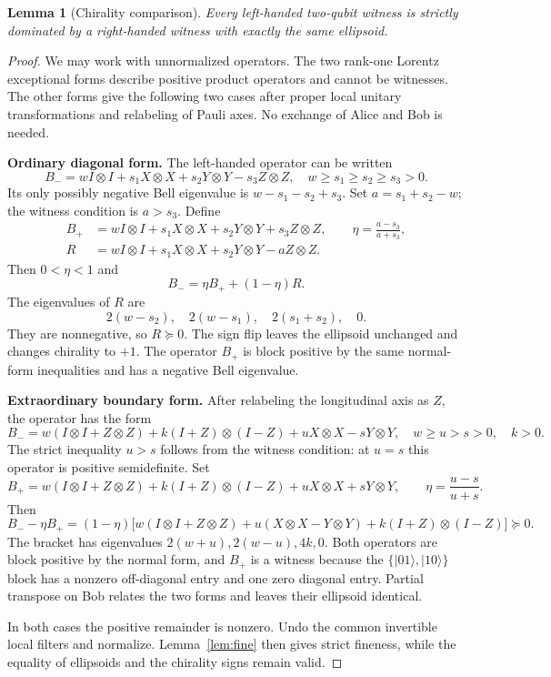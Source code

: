 \documentclass[11pt,a4paper]{article}
\newtheorem{lemma}[theorem]{Lemma}
\theoremstyle{definition}\newtheorem{definition}[theorem]{Definition}
\newcommand{\ket}[1]{\lvert #1\rangle}
\newcommand{\XX}{X\otimes X}
\newcommand{\YY}{Y\otimes Y}
\newcommand{\ZZ}{Z\otimes Z}
\newcommand{\II}{I\otimes I}
\theoremstyle{plain}\newtheorem*{theorem*}{Theorem}
\begin{document}
\begin{lemma}[Chirality comparison]\label{lem:mirror}
Every left-handed two-qubit witness is strictly dominated by a right-handed witness with exactly the same ellipsoid.
\end{lemma}
\begin{proof}
We may work with unnormalized operators. The two rank-one Lorentz exceptional forms describe positive product operators and cannot be witnesses. The other forms give the following two cases after proper local unitary transformations and relabeling of Pauli axes. No exchange of Alice and Bob is needed.

\textbf{Ordinary diagonal form.} The left-handed operator can be written
\[
 B_-=w\II+s_1\XX+s_2\YY-s_3\ZZ,
 \quad w\geq s_1\geq s_2\geq s_3>0.
\]
Its only possibly negative Bell eigenvalue is $w-s_1-s_2+s_3$. Set $a=s_1+s_2-w$; the witness condition is $a>s_3$. Define
\begin{align*}
 B_+&=w\II+s_1\XX+s_2\YY+s_3\ZZ,\qquad \eta=\frac{a-s_3}{a+s_3},\\
 R&=w\II+s_1\XX+s_2\YY-a\ZZ.
\end{align*}
Then $0<\eta<1$ and
\begin{equation}\label{eq:ordinary}
 B_-=\eta B_+ +(1-\eta)R.
\end{equation}
The eigenvalues of $R$ are
\[
 2(w-s_2),\quad2(w-s_1),\quad2(s_1+s_2),\quad0.
\]
They are nonnegative, so $R\succeq0$. The sign flip leaves the ellipsoid unchanged and changes chirality to $+1$. The operator $B_+$ is block positive by the same normal-form inequalities and has a negative Bell eigenvalue.

\textbf{Extraordinary boundary form.} After relabeling the longitudinal axis as $Z$, the operator has the form
\[
 B_-=w(\II+\ZZ)+k(I+Z)\otimes(I-Z)+u\XX-s\YY,
 \quad w\geq u>s>0,\quad k>0.
\]
The strict inequality $u>s$ follows from the witness condition: at $u=s$ this operator is positive semidefinite. Set
\[
 B_+=w(\II+\ZZ)+k(I+Z)\otimes(I-Z)+u\XX+s\YY,
 \qquad\eta=\frac{u-s}{u+s}.
\]
Then
\begin{equation}\label{eq:extraordinary}
 B_- -\eta B_+
 =(1-\eta)\bigl[w(\II+\ZZ)+u(\XX-\YY)+k(I+Z)\otimes(I-Z)\bigr]\succeq0.
\end{equation}
The bracket has eigenvalues $2(w+u),2(w-u),4k,0$. Both operators are block positive by the normal form, and $B_+$ is a witness because the $\{\ket{01},\ket{10}\}$ block has a nonzero off-diagonal entry and one zero diagonal entry. Partial transpose on Bob relates the two forms and leaves their ellipsoid identical.

In both cases the positive remainder is nonzero. Undo the common invertible local filters and normalize. Lemma~\ref{lem:fine} then gives strict fineness, while the equality of ellipsoids and the chirality signs remain valid.
\end{proof}
\end{document}
